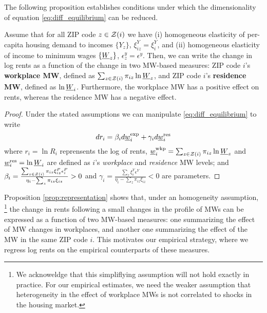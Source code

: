 The following proposition establishes conditions under which the dimensionality
of equation \eqref{eq:diff_equilibrium} can be reduced.

\begin{prop}[Representation]\label{prop:representation}
    Assume that for all ZIP code $z\in\mathcal{Z}(i)$ we have
    (i) homogeneous elasticity of per-capita housing demand to incomes $\{Y_z\}$,
    $\xi^Y_{iz}=\xi^Y_{i}$, and
    (ii) homogeneous elasticity of income to minimum wages $\{\underline{W}_z\}$,
    $\epsilon_z^y=\epsilon^y$.
    Then, we can write the change in log rents as a function of the change in 
    two MW-based measures: ZIP code $i$'s \textbf{workplace MW}, defined
    as $\sum_{z\in\mathcal{Z}(i)} \pi_{iz} \ln \underline{W}_z$, and 
    ZIP code $i$'s \textbf{residence MW}, defined as $\ln\underline{W}_i$.
    Furthermore, the workplace MW has a positive effect on rents, whereas the
    residence MW has a negative effect.
\end{prop}
\begin{proof}
    Under the stated assumptions we can manipulate \eqref{eq:diff_equilibrium} 
    to write
    \begin{equation} \label{eq:theory_represenation}
        d r_i = \beta_i  d \underline{w}^{\text{exp}}_i
              + \gamma_i d \underline{w}^{\text{res}}_i
    \end{equation}
    where
    $r_i=\ln R_i$ reprensents the log of rents,
    $\underline{w}^{\text{wkp}}_i = \sum_{z\in\mathcal{Z}(i)} \pi_{iz} \ln \underline{W}_z$ and
    $\underline{w}^{\text{res}}_i = \ln \underline{W}_i$ are defined as $i$'s 
    \textit{workplace} and \textit{residence} MW levels; and
    $\beta_i = \frac{\sum_{z\in\mathcal{Z}(i)}\pi_{iz}\xi_{iz}^{P}\epsilon_{i}^{P}}
                    {\eta_{i} - \sum_z \pi_{iz} \xi_{iz}} 
             >0$ and
    $\gamma_i = \frac{\sum_z \xi_{i}^{Y}\epsilon^{Y}}
                     {\eta_{i} - \sum_z \pi_{iz} \xi_{iz}} 
              < 0$
    are parameters.
\end{proof}

Proposition \ref{prop:representation} shows that, under an homogeneity assumption,%
\footnote{We acknoweldge that this simpliflying assumption will not hold exactly
in practice.
For our empirical estimates, we need the weaker assumption that heterogeneity in 
the effect of workplace MWs is not correlated to shocks in the housing market.}
the change in rents following a small changes in the profile of MWs can be 
expressed as a function of two MW-based measures: 
one summarizing the effect of MW changes in workplaces,
and another one summarizing the effect of the MW in the same ZIP code $i$.
This motivates our empirical strategy, where we regress log rents on the empirical
counterparts of these measures.

